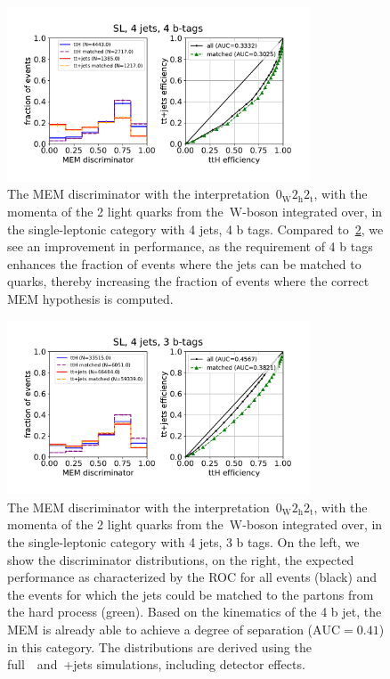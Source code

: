 \begin{figure}[ht]
\begin{centering}
\includegraphics[width = 0.8\textwidth]{figures/mem/mem_sl_j4_t4.pdf}
\caption[MEM with the~$0_{\mathrm{W}} 2_{\mathrm{h}} 2_{\mathrm{t}}$ interpretation in the 4~jet, 4~b~tag category]{The MEM discriminator with the interpretation~$0_{\mathrm{W}} 2_{\mathrm{h}} 2_{\mathrm{t}}$, with the momenta of the 2 light quarks from the~$\mathrm{W}$-boson integrated over, in the single-leptonic category with 4 jets, 4 b tags. Compared to~\cref{fig:mem_sl_j4_t3}, we see an improvement in performance, as the requirement of 4 b tags enhances the fraction of events where the jets can be matched to quarks, thereby increasing the fraction of events where the correct MEM hypothesis is computed.}
\label{fig:mem_sl_j4_t4}
\end{centering}
\end{figure}

\begin{figure}[ht]
\begin{centering}
\includegraphics[width = 0.8\textwidth]{figures/mem/mem_sl_j4_t3.pdf}
\caption[MEM with the~$0_{\mathrm{W}} 2_{\mathrm{h}} 2_{\mathrm{t}}$ interpretation in the 4~jet, 3~b~tag category]{The MEM discriminator with the interpretation~$0_{\mathrm{W}} 2_{\mathrm{h}} 2_{\mathrm{t}}$, with the momenta of the 2 light quarks from the~$\mathrm{W}$-boson integrated over, in the single-leptonic category with 4 jets, 3 b tags. On the left, we show the discriminator distributions, on the right, the expected performance as characterized by the ROC for all events (black) and the events for which the jets could be matched to the partons from the hard process (green). Based on the kinematics of the 4 b jet, the MEM is already able to achieve a degree of separation ($\mathrm{AUC} = 0.41$) in this category. The distributions are derived using the full~\ttHbb~and~\ttbar+jets simulations, including detector effects.}
\label{fig:mem_sl_j4_t3}
\end{centering}
\end{figure}

